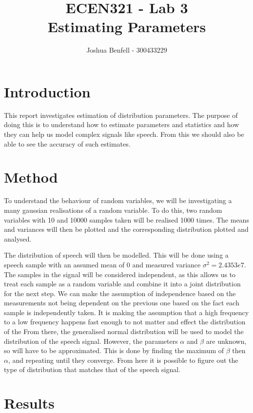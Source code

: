 \documentclass[a4paper, 12pt]{article}
\title{ECEN321 - Lab 3 \\
    Estimating Parameters
}
\author{Joshua Benfell - 300433229}
\begin{document}
    \maketitle
    
    \section{Introduction}

        This report investigates estimation of distribution parameters. The purpose of doing this is to understand how to estimate parameters and statistics and how they can help us model complex signals like speech. From this we should also be able to see the accuracy of such estimates. 

    \section{Method}

        To understand the behaviour of random variables, we will be investigating a many gaussian realisations of a random variable. To do this, two random variables with 10 and 10000 samples taken will be realised 1000 times. The means and variances will then be plotted and the corresponding distribution plotted and analysed. 
        \par
        The distribution of speech will then be modelled. This will be done using a speech sample with an assumed mean of 0 and measured variance $\sigma^2 = 2.4353e7$. The samples in the signal will be considered independent, as this allows us to treat each sample as a random variable and combine it into a joint distribution for the next step. We can make the assumption of independence based on the measurements not being dependent on the previous one based on the fact each sample is independently taken. It is making the assumption that a high frequency to a low frequency happens fast enough to not matter and effect the distribution of the From there, the generalised normal distribution will be used to model the distribution of the speech signal. However, the parameters $\alpha$ and $\beta$ are unknown, so will have to be approximated. This is done by finding the maximum of $\beta$ then $\alpha$, and repeating until they converge. From here it is possible to figure out the type of distribution that matches that of the speech signal. 

    \section{Results}   
\end{document}

